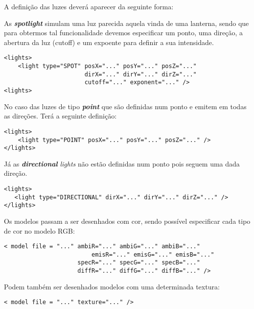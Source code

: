 \documentclass[11pt,a4paper]{report}
\begin{document}
A definição das luzes deverá aparecer da seguinte forma: 

As \textbf{\emph{spotlight}} simulam uma luz parecida aquela vinda de uma lanterna, sendo que para obtermos tal funcionalidade devemos especificar um ponto, uma direção, a abertura da luz (cutoff) e um expoente para definir a sua intensidade.

\begin{lstlisting}[style = xml]
<lights>
    <light type="SPOT" posX="..." posY="..." posZ="..."
                       dirX="..." dirY="..." dirZ="..."
                       cutoff="..." exponent="..." />
<lights>
\end{lstlisting}

No caso das luzes de tipo \textbf{ \emph{point}} que são definidas num ponto e emitem em todas as direções. Terá a seguinte definição:

\begin{lstlisting}[style = xml]
<lights>
    <light type="POINT" posX="..." posY="..." posZ="..." />
</lights>
\end{lstlisting}

Já as \textbf{\emph{directional}} \emph{lights} não estão definidas num ponto pois seguem uma dada direção.
\begin{lstlisting}[style = xml]
<lights>
   <light type="DIRECTIONAL" dirX="..." dirY="..." dirZ="..." />
</lights>
\end{lstlisting}

\iffalse 
Para todos os tipos de luzes enunciados a cima podem especificar a intensidade RGB das luzes no que toca à componente difusa, ambiente e especular, assim:
\begin{lstlisting}[style = xml]
<light ... ambiR="..." ambiG="..." ambiB="..."
           specR="..." specG="..." specB="..."
     diffR="..." diffG="..." diffB="..." />
\end{lstlisting}
\fi

Os modelos passam a ser desenhados com cor, sendo possível especificar cada tipo de cor no modelo RGB:
\begin{lstlisting}[style = xml]
< model file = "..." ambiR="..." ambiG="..." ambiB="..."
		                 emisR="..." emisG="..." emisB="..."
                     specR="..." specG="..." specB="..."
                     diffR="..." diffG="..." diffB="..." />
\end{lstlisting}

Podem também ser desenhados modelos com uma determinada textura:
\begin{lstlisting}[style = xml]
< model file = "..." texture="..." />
\end{lstlisting}
\end{document}
